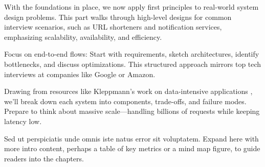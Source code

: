 
With the foundations in place, we now apply first principles to real-world system design problems. This part walks through high-level designs for common interview scenarios, such as URL shorteners and notification services, emphasizing scalability, availability, and efficiency.

\begin{designbox}
Focus on end-to-end flows: Start with requirements, sketch architectures, identify bottlenecks, and discuss optimizations. This structured approach mirrors top tech interviews at companies like Google or Amazon.
\end{designbox}

Drawing from resources like Kleppmann's work on data-intensive applications \cite{kleppmann2017}, we'll break down each system into components, trade-offs, and failure modes. Prepare to think about massive scale—handling billions of requests while keeping latency low.

Sed ut perspiciatis unde omnis iste natus error sit voluptatem. Expand here with more intro content, perhaps a table of key metrics or a mind map figure, to guide readers into the chapters.